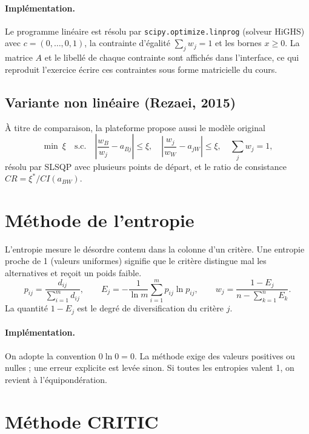 \documentclass[11pt,a4paper]{report}
\theoremstyle{definition}
\theoremstyle{remark}
\begin{document}
\paragraph{Implémentation.} Le programme linéaire est résolu par
\texttt{scipy.optimize.linprog} (solveur HiGHS) avec $c=(0,\dots,0,1)$, la contrainte d'égalité
$\sum_j w_j=1$ et les bornes $x\ge 0$. La matrice $A$ et le libellé de chaque contrainte sont affichés dans
l'interface, ce qui reproduit l'exercice \og écrire ces contraintes sous forme matricielle \fg{} du cours.

\subsection{Variante non linéaire (Rezaei, 2015)}
À titre de comparaison, la plateforme propose aussi le modèle original
\begin{equation}
  \min\ \xi\quad\text{s.c.}\quad \left|\frac{w_B}{w_j}-a_{Bj}\right|\le\xi,\quad
  \left|\frac{w_j}{w_W}-a_{jW}\right|\le\xi,\quad \sum_j w_j=1,
\end{equation}
résolu par SLSQP avec plusieurs points de départ, et le ratio de consistance $CR=\xi^*/CI(a_{BW})$.

\section{Méthode de l'entropie}

L'entropie mesure le désordre contenu dans la colonne d'un critère. Une entropie proche de 1 (valeurs
uniformes) signifie que le critère distingue mal les alternatives et reçoit un poids faible.
\begin{equation}
  p_{ij}=\frac{d_{ij}}{\sum_{i=1}^m d_{ij}},\qquad
  E_j=-\frac{1}{\ln m}\sum_{i=1}^m p_{ij}\ln p_{ij},\qquad
  w_j=\frac{1-E_j}{n-\sum_{k=1}^n E_k}.
\end{equation}
La quantité $1-E_j$ est le degré de diversification du critère $j$.

\paragraph{Implémentation.} On adopte la convention $0\ln 0=0$. La méthode exige des valeurs positives ou
nulles ; une erreur explicite est levée sinon. Si toutes les entropies valent 1, on revient à
l'équipondération.

\section{Méthode CRITIC}
\end{document}
